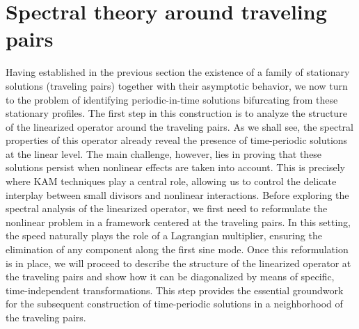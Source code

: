\documentclass[a4paper,reqno,10pt]{article}
\begin{document}
\section{Spectral theory around traveling pairs}\label{sect.linear.eq}

Having established in the previous section the existence of a family of stationary solutions (traveling pairs) together with their asymptotic behavior, we now turn to the problem of identifying periodic-in-time solutions bifurcating from these stationary profiles. The first step in this construction is to analyze the structure of the linearized operator around the traveling pairs. As we shall see, the spectral properties of this operator already reveal the presence of time-periodic solutions at the linear level.
The main challenge, however, lies in proving that these solutions persist when nonlinear effects are taken into account. This is precisely where KAM techniques play a central role, allowing us to control the delicate interplay between small divisors and nonlinear interactions. 
Before exploring the spectral analysis of the linearized operator, we first need to reformulate the nonlinear problem in a framework centered at the traveling pairs. In this setting, the speed naturally plays the role of a Lagrangian multiplier, ensuring the elimination of any  component along the first sine mode. Once this reformulation is in place, we will proceed to describe the structure of the linearized operator at the traveling pairs and show how it can be diagonalized by means of specific, time-independent transformations. This step provides the essential groundwork for the subsequent construction of time-periodic solutions in a neighborhood of the traveling pairs.
\end{document}
